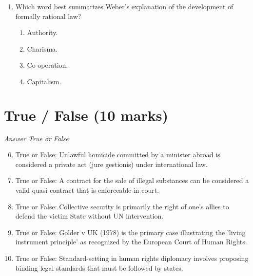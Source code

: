 \documentclass[12pt]{article}
\begin{document}
\begin{enumerate}[label=\arabic*.]
\begin{enumerate}[label=(\alph*)]
    \item That there is no distinction between law and morality.
    \item That there is a distinction between right and wrong.
    \item That facts about the world or human nature cannot normally ordain what ought to be
    \item That human rights are fundamentally unsound.
\end{enumerate}
\item Which word best summarizes Weber's explanation of the development of formally rational law?
\begin{enumerate}[label=(\alph*)]
    \item Authority.
    \item Charisma.
    \item Co-operation.
    \item Capitalism.
\end{enumerate}
\end{enumerate}

\section*{True / False (10 marks)}
\textit{Answer True or False}
\begin{enumerate}[label=\arabic*.]
\setcounter{enumi}{5}
\item True or False: Unlawful homicide committed by a minister abroad is considered a private act (jure gestionis) under international law.
\item True or False: A contract for the sale of illegal substances can be considered a valid quasi contract that is enforceable in court.
\item True or False: Collective security is primarily the right of one's allies to defend the victim State without UN intervention.
\item True or False: Golder v UK (1978) is the primary case illustrating the 'living instrument principle' as recognized by the European Court of Human Rights.
\item True or False: Standard-setting in human rights diplomacy involves proposing binding legal standards that must be followed by states.
\end{enumerate}
\end{document}
